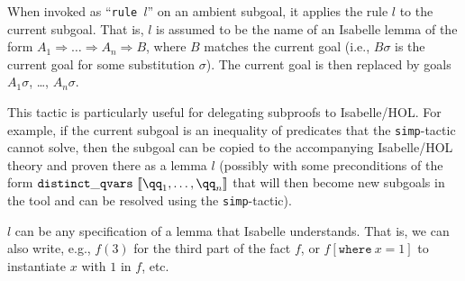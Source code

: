 \documentclass{article}
\begin{document}

When invoked as ``\texttt{\frenchspacing rule $l$}''
on an ambient subgoal, it applies the rule $l$
to the current subgoal. That is, $l$
is assumed to be the name of an Isabelle lemma of the form
$A_1\Longrightarrow\dots\Longrightarrow A_n\Longrightarrow B$,
where $B$
matches the current goal (i.e., $B\sigma$
is the current goal for some substitution $\sigma$). The current goal is then replaced by goals
$A_1\sigma$, \dots, $A_n\sigma$.

This tactic is particularly useful for delegating subproofs to
Isabelle/HOL. For example, if the current subgoal is an inequality of
predicates that the \texttt{simp}-tactic cannot solve, then the
subgoal can be copied to the accompanying Isabelle/HOL theory and
proven there as a lemma $l$
(possibly with some preconditions of the form
$\mathtt{distinct\_qvars}\ \llbracket \qq_1,\dots,\qq_n\rrbracket$
that will then become new subgoals in the tool and can be resolved
using the \texttt{simp}-tactic).

$l$ can be any specification of a lemma that Isabelle
understands. That is, we can also write, e.g., $f(3)$ for the third
part of the fact $f$, or $f[\mathtt{where}\ x=1]$ to instantiate $x$
with $1$ in $f$, etc.

\end{document}
